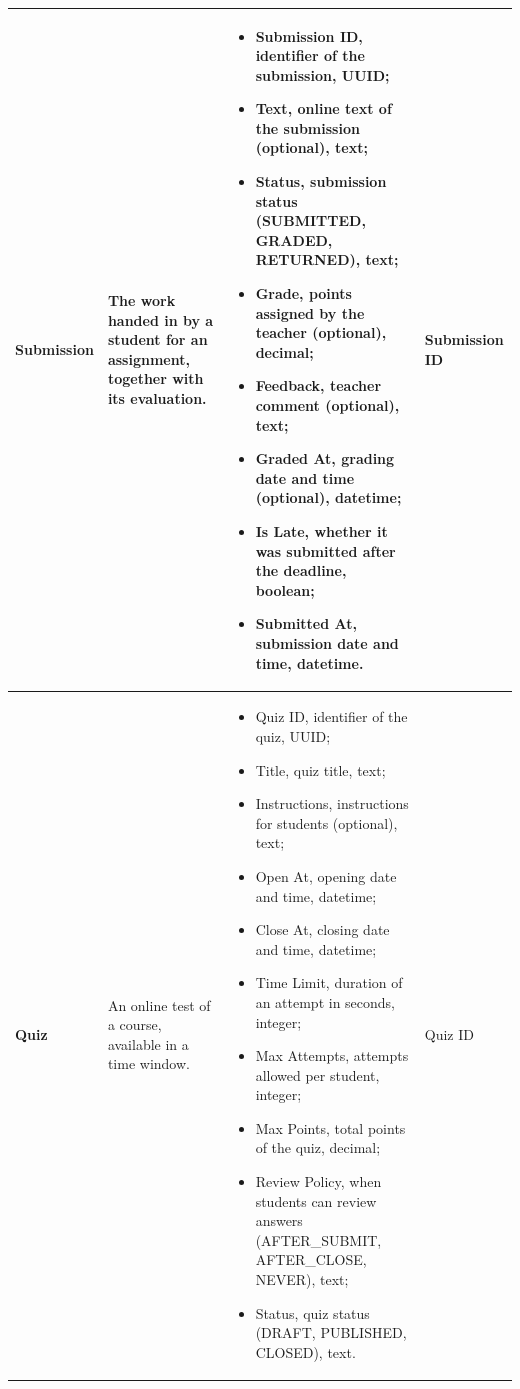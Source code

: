{\begin{longtable}{|p{}|p{}|p{}|p{}|}
    \textbf{Submission} & The work handed in by a student for an assignment, together with its evaluation. &
    \begin{itemize}[leftmargin=*,nosep,before=\vspace{-\baselineskip}\leavevmode,after=\vspace{-\baselineskip}]
        \item Submission ID, identifier of the submission, UUID;
        \item Text, online text of the submission (optional), text;
        \item Status, submission status (SUBMITTED, GRADED, RETURNED), text;
        \item Grade, points assigned by the teacher (optional), decimal;
        \item Feedback, teacher comment (optional), text;
        \item Graded At, grading date and time (optional), datetime;
        \item Is Late, whether it was submitted after the deadline, boolean;
        \item Submitted At, submission date and time, datetime.
    \end{itemize}
    & Submission ID \\ \hline

    \textbf{Quiz} & An online test of a course, available in a time window. &
    \begin{itemize}[leftmargin=*,nosep,before=\vspace{-\baselineskip}\leavevmode,after=\vspace{-\baselineskip}]
        \item Quiz ID, identifier of the quiz, UUID;
        \item Title, quiz title, text;
        \item Instructions, instructions for students (optional), text;
        \item Open At, opening date and time, datetime;
        \item Close At, closing date and time, datetime;
        \item Time Limit, duration of an attempt in seconds, integer;
        \item Max Attempts, attempts allowed per student, integer;
        \item Max Points, total points of the quiz, decimal;
        \item Review Policy, when students can review answers (AFTER\_SUBMIT, AFTER\_CLOSE, NEVER), text;
        \item Status, quiz status (DRAFT, PUBLISHED, CLOSED), text.
    \end{itemize}
    & Quiz ID \\ \hline


\end{longtable}}
